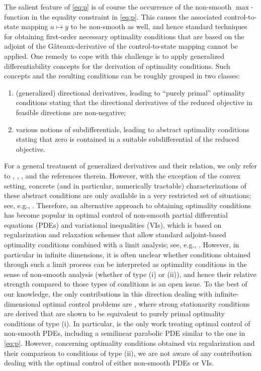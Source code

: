 \documentclass[reqno]{shinyart}
\begin{document}
The salient feature of \eqref{eq:p} is of course the occurrence of the
non-smooth $\max$-function in the equality constraint in \eqref{eq:p}. This causes the associated 
control-to-state mapping $u\mapsto y$ to be non-smooth as well, and hence standard techniques for obtaining first-order necessary optimality conditions that are based on the adjoint of the G\^ateaux-derivative of 
the control-to-state mapping cannot be applied. 
One remedy to cope with this challenge is to apply generalized differentiability concepts
for the derivation of optimality conditions.
Such concepts and the resulting conditions can be roughly grouped in two classes:
\begin{enumerate}[label=(\roman*)]
    \item (generalized) directional derivatives, leading to ``purely primal'' optimality conditions stating that the directional derivatives of the reduced objective in feasible directions are non-negative;
    \item various notions of subdifferentials, leading to abstract optimality conditions stating that zero is contained in a suitable subdifferential of the reduced objective.
\end{enumerate}
For a general treatment of generalized derivatives and their relation, we only refer to \cite[Chap.~10A]{rw04}, 
\cite[Prop.~2.3.2]{Clarke:1990}, \cite[Prop.~7.3.6 and 9.1.5]{schirotzek}, and the references therein. However, with the exception of the convex setting, concrete (and in particular, numerically tractable) characterizations of these abstract conditions are only available in a very restricted set of situations; see, e.g., \cite{Outrata2005,Henrion:2010,ClasonValkonen15,Mehlitz2016}.
Therefore, an alternative approach to obtaining optimality conditions has become popular in optimal control of non-smooth partial differential equations (PDEs) and 
variational inequalities (VIs), which is based on regularization and relaxation schemes that allow standard adjoint-based optimality conditions combined with a limit analysis; see, e.g., \cite{barbu, tiba, b98, ik00, h08, sw13}.
However, in particular in infinite dimensions, it is often unclear 
whether conditions obtained through such a limit process can be interpreted as optimality conditions in the sense of non-smooth analysis (whether of type (i) or (ii)), and hence their relative strength compared to those types of conditions is an open issue.
To the best of our knowledge, the only contributions in this direction dealing with infinite-dimensional optimal control problems are \cite{m76, mp84, ojs11, hmw10, ms16, Wachsmuth16a, Wachsmuth16b}, where strong stationarity conditions
are derived that are shown to be equivalent to purely primal optimality conditions 
of type (i). In particular, \cite{ms16} is the only work treating optimal control of non-smooth PDEs, including a semilinear parabolic PDE similar to the one in \eqref{eq:p}.
However, concerning optimality conditions obtained via regularization and 
their comparison to conditions of type (ii), we are not aware of 
any contribution dealing with the optimal control of either non-smooth PDEs or VIs. 
\end{document}
